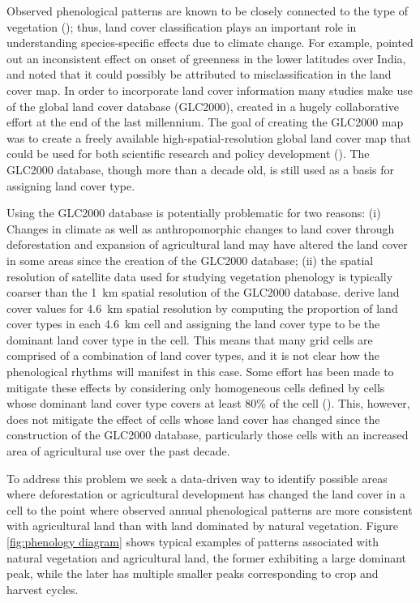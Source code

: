 Observed phenological patterns are known to be closely connected to the type of vegetation (\cite{Dash:2010kva}); thus, land cover classification plays an important role in understanding species-specific effects due to climate change. For example, \cite{Dash:2010kva} pointed out an inconsistent effect on onset of greenness in the lower latitudes over India, and noted that it could possibly be attributed to misclassification in the land cover map. In order to incorporate land cover information many studies make use of the global land cover database (GLC2000), created in a hugely collaborative effort at the end of the last millennium. The goal of creating the GLC2000 map was to create a freely available high-spatial-resolution global land cover map that could be used for both scientific research and policy development (\cite{Bartholome:2005cq}). The GLC2000 database, though more than a decade old, is still used as a basis for assigning land cover type. 

Using the GLC2000 database is potentially problematic for two reasons: (i) Changes in climate as well as anthropomorphic changes to land cover through deforestation and expansion of agricultural land may have altered the land cover in some areas since the creation of the GLC2000 database; (ii) the spatial resolution of satellite data used for studying vegetation phenology is typically coarser than the 1~km spatial resolution of the GLC2000 database. \cite{Dash:2010kva} derive land cover values for 4.6~km spatial resolution by computing the proportion of land cover types in each 4.6~km cell and assigning the land cover type to be the dominant land cover type in the cell. This means that many grid cells are comprised of a combination of land cover types, and it is not clear how the phenological rhythms will manifest in this case. Some effort has been made to mitigate these effects by considering only homogeneous cells defined by cells whose dominant land cover type covers at least 80\% of the cell (\cite{Jeganathan:2010gqa}). This, however, does not mitigate the effect of cells whose land cover has changed since the construction of the GLC2000 database, particularly those cells with an increased area of agricultural use over the past decade. 

To address this problem we seek a data-driven way to identify possible areas where deforestation or agricultural development has changed the land cover in a cell to the point where observed annual phenological patterns are more consistent with agricultural land than with land dominated by natural vegetation. Figure \ref{fig:phenology diagram} shows typical examples of patterns associated with natural vegetation and agricultural land, the former exhibiting a large dominant peak, while the later has multiple smaller peaks corresponding to crop and harvest cycles. 

